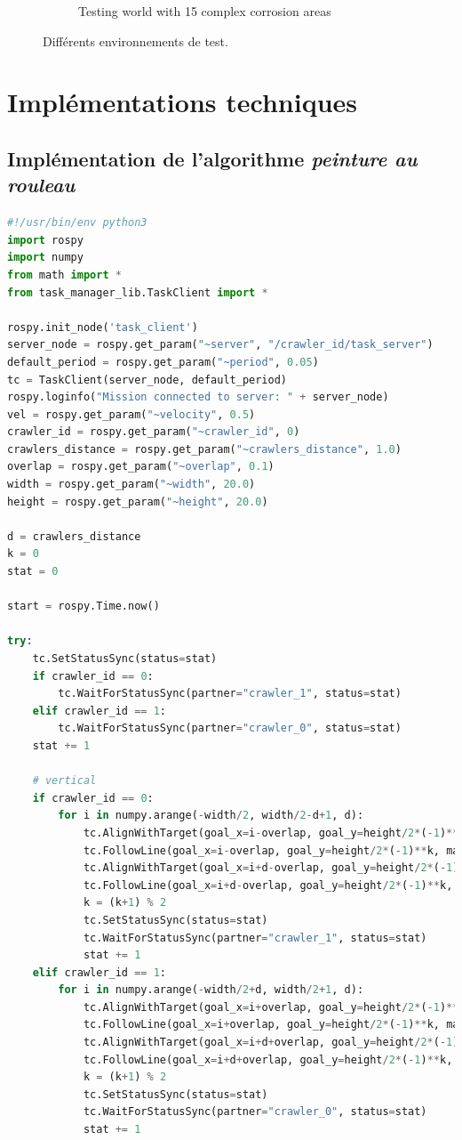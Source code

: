 \documentclass[francais,RandD]{rapportPFE}
\begin{document}
\begin{figure}[h!]
\begin{subfigure}[t]{0.15\linewidth}
				\caption{Testing world with 15 complex corrosion areas}
				\label{fig:test_model_15_complex_1}
			\end{subfigure}
			\caption{Différents environnements de test.}
			\label{fig:test_models}
		\end{figure}
	\section{Implémentations techniques}
		\label{annexe:implementations}
		\subsection{Implémentation de l'algorithme \textit{peinture au rouleau}}
			\begin{lstlisting}[language=Python,caption={Implémentation de l'algorithme de peinture au rouleau},label=lst:peinture_au_rouleau]
#!/usr/bin/env python3
import rospy
import numpy
from math import *
from task_manager_lib.TaskClient import *

rospy.init_node('task_client')
server_node = rospy.get_param("~server", "/crawler_id/task_server")
default_period = rospy.get_param("~period", 0.05)
tc = TaskClient(server_node, default_period)
rospy.loginfo("Mission connected to server: " + server_node)
vel = rospy.get_param("~velocity", 0.5)
crawler_id = rospy.get_param("~crawler_id", 0)
crawlers_distance = rospy.get_param("~crawlers_distance", 1.0)
overlap = rospy.get_param("~overlap", 0.1)
width = rospy.get_param("~width", 20.0)
height = rospy.get_param("~height", 20.0)

d = crawlers_distance
k = 0
stat = 0

start = rospy.Time.now()

try:
	tc.SetStatusSync(status=stat)
	if crawler_id == 0:
		tc.WaitForStatusSync(partner="crawler_1", status=stat)
	elif crawler_id == 1:
		tc.WaitForStatusSync(partner="crawler_0", status=stat)
	stat += 1

	# vertical
	if crawler_id == 0:
		for i in numpy.arange(-width/2, width/2-d+1, d):
			tc.AlignWithTarget(goal_x=i-overlap, goal_y=height/2*(-1)**k)
			tc.FollowLine(goal_x=i-overlap, goal_y=height/2*(-1)**k, max_velocity=vel)
			tc.AlignWithTarget(goal_x=i+d-overlap, goal_y=height/2*(-1)**k)
			tc.FollowLine(goal_x=i+d-overlap, goal_y=height/2*(-1)**k, max_velocity=vel)
			k = (k+1) % 2
			tc.SetStatusSync(status=stat)
			tc.WaitForStatusSync(partner="crawler_1", status=stat)
			stat += 1
	elif crawler_id == 1:
		for i in numpy.arange(-width/2+d, width/2+1, d):
			tc.AlignWithTarget(goal_x=i+overlap, goal_y=height/2*(-1)**k)
			tc.FollowLine(goal_x=i+overlap, goal_y=height/2*(-1)**k, max_velocity=vel)
			tc.AlignWithTarget(goal_x=i+d+overlap, goal_y=height/2*(-1)**k)
			tc.FollowLine(goal_x=i+d+overlap, goal_y=height/2*(-1)**k, max_velocity=vel)
			k = (k+1) % 2
			tc.SetStatusSync(status=stat)
			tc.WaitForStatusSync(partner="crawler_0", status=stat)
			stat += 1


\end{lstlisting}
\end{document}
